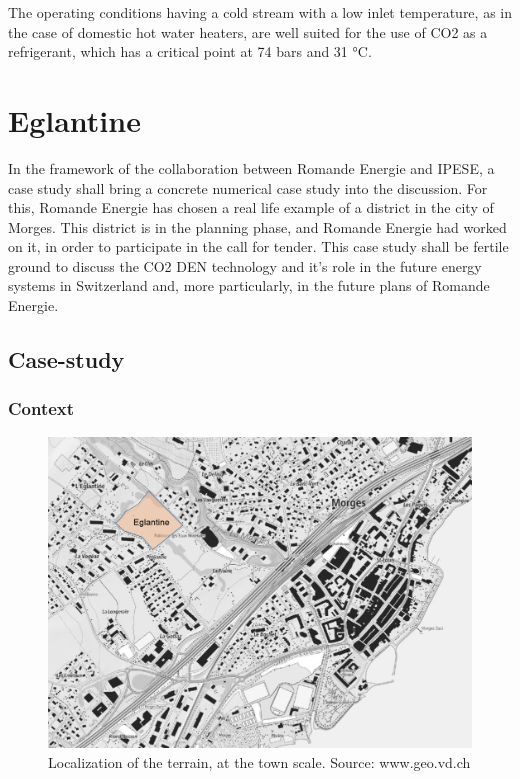 \documentclass{article}
\begin{document}
The operating conditions having a cold stream with a low inlet temperature, as in the case of domestic hot water heaters, are well suited for the use of CO2 as a refrigerant, which has a critical point at 74 bars and 31 \si{\celsius}\cite{cavalliniPROPERTIESCO2REFRIGERANT}.

\section{Eglantine}
In the framework of the collaboration between Romande Energie and IPESE, a case study shall bring a concrete numerical case study into the discussion. For this, Romande Energie has chosen a real life example of a district in the city of Morges. This district is in the planning phase, and Romande Energie had worked on it, in order to participate in the call for tender. This case study shall be fertile ground to discuss the CO2 DEN technology and it's role in the future energy systems in Switzerland and, more particularly, in the future plans of Romande Energie.

\subsection{Case-study}
\subsubsection{Context}

\begin{figure}[h!]
\centering
\includegraphics[width=1\textwidth]{morges.png}
\caption{Localization of the terrain, at the town scale. Source: www.geo.vd.ch}
\label{fig:morges}
\end{figure}
\end{document}
